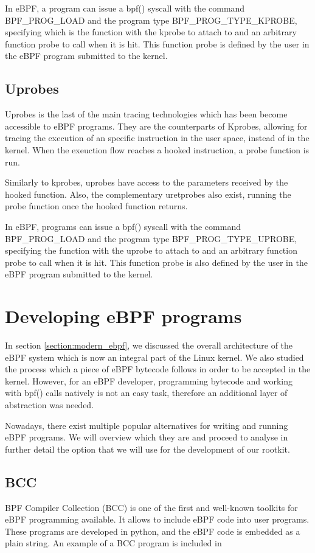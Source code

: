 \documentclass[12pt]{report} %
\begin{document}
In eBPF, a program can issue a bpf() syscall with the command BPF\_PROG\_LOAD and the program type BPF\_PROG\_TYPE\_KPROBE, specifying which is the function with the kprobe to attach to and an arbitrary function probe to call when it is hit. This function probe is defined by the user in the eBPF program submitted to the kernel.

\subsection{Uprobes}
Uprobes is the last of the main tracing technologies which has been become accessible to eBPF programs. They are the counterparts of Kprobes, allowing for tracing the execution of an specific instruction in the user space, instead of in the kernel. When the exeuction flow reaches a hooked instruction, a probe function is run. 

Similarly to kprobes, uprobes have access to the parameters received by the hooked function. Also, the complementary uretprobes also exist, running the probe function once the hooked function returns.

In eBPF, programs can issue a bpf() syscall with the command BPF\_PROG\_LOAD and the program type BPF\_PROG\_TYPE\_UPROBE, specifying the function with the uprobe to attach to and an arbitrary function probe to call when it is hit. This function probe is also defined by the user in the eBPF program submitted to the kernel.

\section{Developing eBPF programs}
In section \ref{section:modern_ebpf}, we discussed the overall architecture of the eBPF system which is now an integral part of the Linux kernel. We also studied the process which a piece of eBPF bytecode follows in order to be accepted in the kernel. However, for an eBPF developer, programming bytecode and working with bpf() calls natively is not an easy task, therefore an additional layer of abstraction was needed. 

Nowadays, there exist multiple popular alternatives for writing and running eBPF programs. We will overview which they are and proceed to analyse in further detail the option that we will use for the development of our rootkit.

\subsection{BCC}
BPF Compiler Collection (BCC) is one of the first and well-known toolkits for eBPF programming available\cite{bcc_github}. It allows to include eBPF code into user programs. These programs are developed in python, and the eBPF code is embedded as a plain string. An example of a BCC program is included in %
\end{document}
